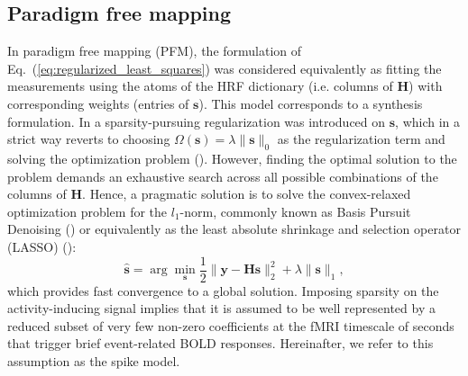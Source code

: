 \subsection{Paradigm free mapping}
 In paradigm free mapping (PFM), the formulation of Eq.~(\ref{eq:regularized_least_squares}) was considered equivalently as fitting the measurements using the atoms of the HRF dictionary (i.e. columns of $\mathbf{H}$) with corresponding weights (entries of $\mathbf{s}$). This model corresponds to a synthesis formulation. In \citealt{Gaudes2013Paradigmfreemapping} a sparsity-pursuing regularization was introduced on $\mathbf{s}$, which in a strict way reverts to choosing \(\Omega(\mathbf{s})=\lambda \| \mathbf{s} \|_0\) as the regularization term and solving the optimization problem (\citealt{Bruckstein2009SparseSolutionsSystems}). However, finding the optimal solution to the problem demands an exhaustive search across all possible combinations of the columns of \(\mathbf{H}\). Hence, a  pragmatic solution is to solve the convex-relaxed optimization problem for the \(l_1\)-norm, commonly known as Basis Pursuit Denoising (\citealt{Chen2001BasisPursuitDenoising}) or equivalently as the least absolute shrinkage and selection operator (LASSO) (\citealt{Tibshirani1996RegressionShrinkageSelection}): 
\begin{equation}
    \label{eq:pfm_spike}
    \hat{\mathbf{s}} = \arg \min_{\mathbf{s}} \frac{1}{2} \| \mathbf{y} - \mathbf{Hs} \|_2^2 + \lambda \| \mathbf{s} \|_1,
\end{equation}
which provides fast convergence to a global solution. Imposing sparsity on the activity-inducing signal implies that it is assumed to be well represented by a reduced subset of very few non-zero coefficients at the fMRI timescale of seconds that trigger brief event-related BOLD responses. Hereinafter, we refer to this assumption as the spike model. 


